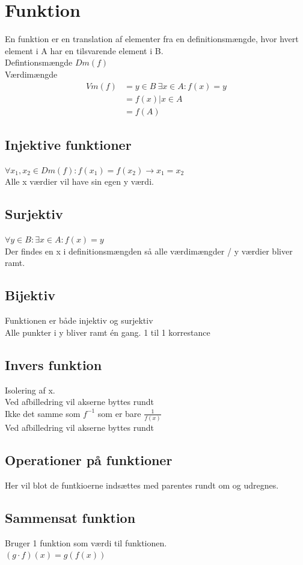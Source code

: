 \documentclass[12pt, a4paper]{article}
\begin{document}
			\section{Funktion}
				En funktion er en translation af elementer fra en definitionsmængde, hvor hvert element i A har en tilsvarende element i B.\\
				Defintionsmængde $Dm(f)$\\
				Værdimængde 
				\begin{align*}
					Vm(f)&={y\in B \ \exists x \in A: f(x)=y}\\
						&={f(x)|x\in A}\\
						&=f(A)
				\end{align*}
				\subsection{Injektive funktioner}
					$\forall x_1,x_2 \in Dm(f): f(x_1)=f(x_2)\rightarrow x_1=x_2$\\
					Alle x værdier vil have sin egen y værdi.
				\subsection{Surjektiv}
					$\forall y \in B: \exists x \in A: f(x)=y$\\
					Der findes en x i definitionsmængden så alle værdimængder / y værdier bliver ramt.
				\subsection{Bijektiv}
					Funktionen er både injektiv og surjektiv\\
					Alle punkter i y bliver ramt én gang. 1 til 1 korrestance 
				\subsection{Invers funktion}
					Isolering af x.\\
					Ved afbilledring vil akserne byttes rundt\\
					Ikke det samme som $f^{-1}$ som er bare $\frac{1}{f(x)}$\\
					Ved afbilledring vil akserne byttes rundt
				\subsection{Operationer på funktioner}
					Her vil blot de funtkioerne indsættes med parentes rundt om og udregnes.
				\subsection{Sammensat funktion}
					Bruger 1 funktion som værdi til funktionen.\\
					$(g\cdot f)(x)=g(f(x))$
\end{document}
